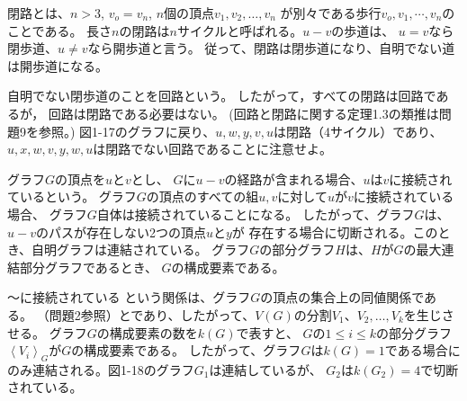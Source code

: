 
閉路とは、$n>3$, $v_o=v_n$, $n$個の頂点$v_1, v_2,\dots, v_n$
が別々である歩行$v_o, v_1, \cdots, v_n$のことである。
長さ$n$の閉路は$n$サイクルと呼ばれる。$u-v$の歩道は、
$u=v$なら閉歩道、$u\neq v$なら開歩道と言う。 
従って、閉路は閉歩道になり、自明でない道は開歩道になる。

自明でない閉歩道のことを回路という。
したがって，すべての閉路は回路であるが，
回路は閉路である必要はない。
(回路と閉路に関する定理1.3の類推は問題9を参照。)
図1-17のグラフに戻り、$u, w, y, v, u$は閉路（4サイクル）であり、
$u, x, w, v, y, w, u$は閉路でない回路であることに注意せよ。

グラフ$G$の頂点を$u$と$v$とし、
$G$に$u-v$の経路が含まれる場合、$u$は$v$に接続されているという。
グラフ$G$の頂点のすべての組$u,v$に対して$u$が$v$に接続されている場合、
グラフ$G$自体は接続されていることになる。
したがって、グラフ$G$は、$u-v$のパスが存在しない2つの頂点$u$と$y$が
存在する場合に切断される。このとき、自明グラフは連結されている。
グラフ$G$の部分グラフ$H$は、$H$が$G$の最大連結部分グラフであるとき、
$G$の構成要素である。

～に接続されている という関係は、グラフ$G$の頂点の集合上の同値関係である。
（問題2参照）とであり、したがって、$V(G)$の分割$V_1、V_2,\dots, V_k$を生じさせる。
グラフ$G$の構成要素の数を$k(G)$で表すと、
$G$の$1\leq i\leq k$の部分グラフ$\left\langle V_i \right\rangle _G$が$G$の構成要素である。
したがって、グラフ$G$は$k(G)=1$である場合にのみ連結される。図1-18のグラフ$G_1$は連結しているが、
$G_2$は$k(G_2)=4$で切断されている。
